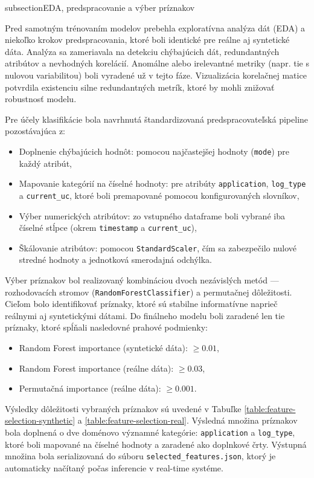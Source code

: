 subsection{EDA, predspracovanie a výber príznakov}

Pred samotným trénovaním modelov prebehla exploratívna analýza dát (EDA) a niekoľko krokov predspracovania, ktoré boli identické pre reálne aj syntetické dáta. Analýza sa zameriavala na detekciu chýbajúcich dát, redundantných atribútov a nevhodných korelácií. Anomálne alebo irelevantné metriky (napr. tie s nulovou variabilitou) boli vyradené už v tejto fáze. Vizualizácia korelačnej matice potvrdila existenciu silne redundantných metrík, ktoré by mohli znižovať robustnosť modelu.

Pre účely klasifikácie bola navrhnutá štandardizovaná predspracovateľská pipeline pozostávajúca z:

\begin{itemize}
  \item Doplnenie chýbajúcich hodnôt: pomocou najčastejšej hodnoty (\texttt{mode}) pre každý atribút,
  \item Mapovanie kategórií na číselné hodnoty: pre atribúty \texttt{application}, \texttt{log\_type} a \texttt{current\_uc}, ktoré boli premapované pomocou konfigurovaných slovníkov,
  \item Výber numerických atribútov: zo vstupného dataframe boli vybrané iba číselné stĺpce (okrem \texttt{timestamp} a \texttt{current\_uc}),
  \item Škálovanie atribútov: pomocou \texttt{StandardScaler}, čím sa zabezpečilo nulové stredné hodnoty a jednotková smerodajná odchýlka.
\end{itemize}

Výber príznakov bol realizovaný kombináciou dvoch nezávislých metód — rozhodovacích stromov (\texttt{RandomForestClassifier}) a permutačnej dôležitosti. Cieľom bolo identifikovať príznaky, ktoré sú stabilne informatívne naprieč reálnymi aj syntetickými dátami. Do finálneho modelu boli zaradené len tie príznaky, ktoré spĺňali nasledovné prahové podmienky:

\begin{itemize}
  \item Random Forest importance (syntetické dáta): $\geq 0.01$,
  \item Random Forest importance (reálne dáta): $\geq 0.03$,
  \item Permutačná importance (reálne dáta): $\geq 0.001$.
\end{itemize}

Výsledky dôležitosti vybraných príznakov sú uvedené v Tabuľke \ref{table:feature-selection-synthetic} a \ref{table:feature-selection-real}. Výsledná množina príznakov bola doplnená o dve doménovo významné kategórie: \texttt{application} a \texttt{log\_type}, ktoré boli mapované na číselné hodnoty a zaradené ako doplnkové črty. Výstupná množina bola serializovaná do súboru \texttt{selected\_features.json}, ktorý je automaticky načítaný počas inferencie v real-time systéme.

